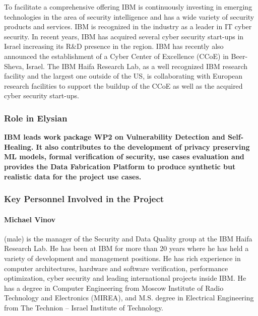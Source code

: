\documentclass[a4paper,11pt]{article}
\begin{document}
To facilitate a comprehensive offering IBM is continuously investing in emerging technologies in the area of security intelligence and has a wide variety of security products and services. IBM is recognized in the industry as a leader in IT cyber security.
In recent years, IBM has acquired several cyber security start-ups in Israel increasing its R\&D presence in the region. IBM has recently also announced the establishment of a Cyber Center of Excellence (CCoE) in Beer-Sheva, Israel. The IBM Haifa Research Lab, as a well recognized IBM research facility and the largest one outside of the US, is collaborating with European research facilities to support the buildup of the CCoE as well as the acquired cyber security start-ups.

\vspace{10pt}
\subsubsection*{Role in Elysian}
\textbf{IBM leads work package WP2 on Vulnerability Detection and Self-Healing. It also contributes to the development of privacy preserving ML models, formal verification of security, use cases evaluation and provides the Data Fabrication Platform to produce synthetic but realistic data for the project use cases.}

\vspace{10pt}
\subsubsection*{Key Personnel Involved in the Project}

\paragraph{Michael Vinov} (male) is the manager of the Security and Data Quality group at the IBM Haifa Research Lab. He has been at IBM for more than 20 years where he has held a variety of development and management positions. He has rich experience in computer architectures, hardware and software verification, performance optimization, cyber security and leading international projects inside IBM. He has a degree in Computer Engineering from Moscow Institute of Radio Technology and Electronics (MIREA), and M.S. degree in Electrical Engineering from The Technion -- Israel Institute of Technology.
\end{document}
